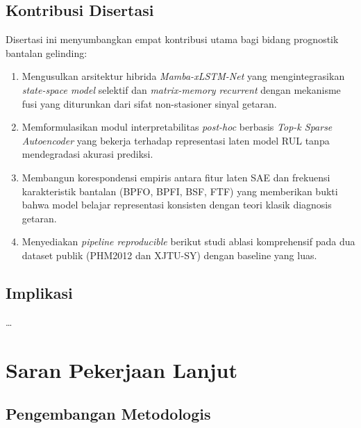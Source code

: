 \subsection{Kontribusi Disertasi}
\label{subsec:bab6_kontribusi}

Disertasi ini menyumbangkan empat kontribusi utama bagi bidang
prognostik bantalan gelinding:

\begin{enumerate}
  \item Mengusulkan arsitektur hibrida \emph{Mamba-xLSTM-Net} yang
        mengintegrasikan \emph{state-space model} selektif dan
        \emph{matrix-memory recurrent} dengan mekanisme fusi yang
        diturunkan dari sifat non-stasioner sinyal getaran.
  \item Memformulasikan modul interpretabilitas \emph{post-hoc}
        berbasis \emph{Top-k Sparse Autoencoder} yang bekerja
        terhadap representasi laten model RUL tanpa mendegradasi
        akurasi prediksi.
  \item Membangun korespondensi empiris antara fitur laten SAE dan
        frekuensi karakteristik bantalan (BPFO, BPFI, BSF, FTF) yang
        memberikan bukti bahwa model belajar representasi konsisten
        dengan teori klasik diagnosis getaran.
  \item Menyediakan \emph{pipeline reproducible} berikut studi ablasi
        komprehensif pada dua dataset publik (PHM2012 dan XJTU-SY)
        dengan baseline yang luas.
\end{enumerate}

\subsection{Implikasi}
\label{subsec:bab6_implikasi}

\dots

\section{Saran Pekerjaan Lanjut}
\label{sec:bab6_saran}

\subsection{Pengembangan Metodologis}
\label{subsec:bab6_saran_metode}

